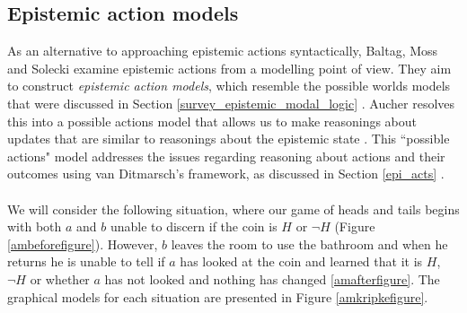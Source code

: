 \subsection{Epistemic action models} \label{act_mods}
As an alternative to approaching epistemic actions syntactically, Baltag, Moss
and Solecki examine epistemic actions from a modelling point of view.
They aim to construct {\em epistemic action models}, which resemble the possible 
worlds models that were discussed in Section \ref{survey_epistemic_modal_logic}
\cite{baltag1998lpa}.
Aucher resolves this into a possible actions model that allows us to make
reasonings about updates that are similar to reasonings about the epistemic
state \cite{aucher09revisited}.
This ``possible actions" model addresses the issues regarding reasoning about
actions and their outcomes using van Ditmarsch's framework, as discussed in
Section \ref{epi_acts} \cite{hoek2008dynamic}.\\
\\
We will consider the following situation, where our game of heads and tails
begins with both $a$ and $b$ unable to discern if the coin is $H$ or $\neg H$ (Figure
\ref{ambeforefigure}).
However, $b$ leaves the room to use the bathroom and when he returns he is unable
to tell if $a$ has looked at the coin and learned that it is $H$, $\neg H$ or whether
$a$ has not looked and nothing has changed \ref{amafterfigure}.
The graphical models for each situation are presented in Figure
\ref{amkripkefigure}.\\

